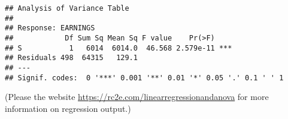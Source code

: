 \documentclass[
]{article}
\begin{document}
\begin{verbatim}
## Analysis of Variance Table
## 
## Response: EARNINGS
##            Df Sum Sq Mean Sq F value    Pr(>F)    
## S           1   6014  6014.0  46.568 2.579e-11 ***
## Residuals 498  64315   129.1                      
## ---
## Signif. codes:  0 '***' 0.001 '**' 0.01 '*' 0.05 '.' 0.1 ' ' 1
\end{verbatim}

(Please the website \url{https://rc2e.com/linearregressionandanova} for
more information on regression output.)
\end{document}
